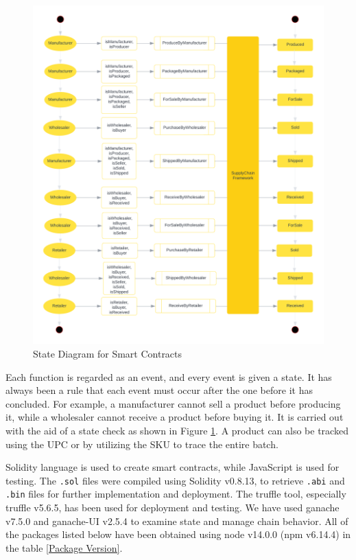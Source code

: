 \vspace{.5cm}

   \begin{figure}[h]
    \centering
      \includegraphics[width=12cm]{includes/figures/State diagram.png} 
      \caption{State Diagram for Smart Contracts}
      \label{State Diagram}
    \end{figure}

\vspace{.5cm}

Each function is regarded as an event, and every event is given a state. It has always been a rule that each event must occur after the one before it has concluded. For example, a manufacturer cannot sell a product before producing it, while a wholesaler cannot receive a product before buying it. It is carried out with the aid of a state check as shown in Figure \ref{State Diagram}. A product can also be tracked using the \ac{UPC} or by utilizing the \ac{SKU} to trace the entire batch.

\vspace{.5cm}

Solidity language is used to create smart contracts, while JavaScript is used for testing. The \texttt{.sol} files were compiled using Solidity v0.8.13, to retrieve \texttt{.abi} and \texttt{.bin} files for further implementation and deployment. The truffle tool, especially truffle v5.6.5, has been used for deployment and testing. We have used ganache v7.5.0 and ganache-UI v2.5.4 to examine state and manage chain behavior. All of the packages listed below have been obtained using node v14.0.0 (npm v6.14.4) in the table \ref{Package Version}.

